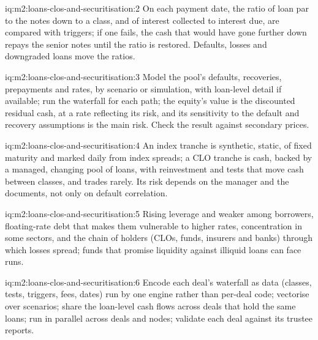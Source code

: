 \begin{solution}{iq:m2:loans-clos-and-securitisation:2}
On each payment date, the ratio of loan par to the notes down to a class, and of
interest collected to interest due, are compared with triggers; if one fails, the cash
that would have gone further down repays the senior notes until the ratio is restored.
Defaults, losses and downgraded loans move the ratios.
\end{solution}

\begin{solution}{iq:m2:loans-clos-and-securitisation:3}
Model the pool's defaults, recoveries, prepayments and rates, by scenario or
simulation, with loan-level detail if available; run the waterfall for each path; the
equity's value is the discounted residual cash, at a rate reflecting its risk, and
its sensitivity to the default and recovery assumptions is the main risk. Check the
result against secondary prices.
\end{solution}

\begin{solution}{iq:m2:loans-clos-and-securitisation:4}
An index tranche is synthetic, static, of fixed maturity and marked daily from index
spreads; a CLO tranche is cash, backed by a managed, changing pool of loans, with
reinvestment and tests that move cash between classes, and trades rarely. Its risk
depends on the manager and the documents, not only on default correlation.
\end{solution}

\begin{solution}{iq:m2:loans-clos-and-securitisation:5}
Rising leverage and weaker  among borrowers, floating-rate debt that makes
them vulnerable to higher rates, concentration in some sectors, and the chain of
holders (CLOs, funds, insurers and banks) through which losses spread; funds that
promise liquidity against illiquid loans can face runs.
\end{solution}

\begin{solution}{iq:m2:loans-clos-and-securitisation:6}
Encode each deal's waterfall as data (classes, tests, triggers, fees, dates) run by one
engine rather than per-deal code; vectorise over scenarios; share the loan-level cash
flows across deals that hold the same loans; run in parallel across deals and nodes;
validate each deal against its trustee reports.
\end{solution}
